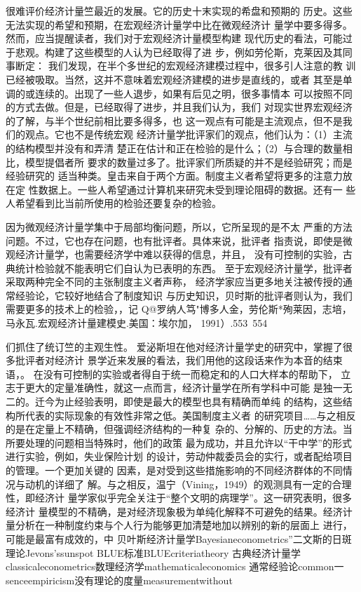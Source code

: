 很难评价经济计量竺最近的发展。它的历史十末实现的希盘和预期的
历史。这些无法实现的希望和预期，在宏观经济计量学中比在微观经济计
量学中要多得多。然而，应当提醒读者，我们对于宏观经济计量模型构建
现代历史的看法，可能过于悲观。构建了这些模型的人认为已经取得了进
步，例如劳伦斯，克莱因及其同事断定：
我们发现，在半个多世纪的宏观经济建模过程中，很多引人注意的教
训已经被吸取。当然，这并不意味着宏观经济建模的进步是直线的，或者
其至是单调的或连续的。出现了一些人退步，如果有后见之明，很多事情本
可以按照不同的方式去做。但是，已经取得了进步，并且我们认为，我们
对现实世界宏观经济的了解，与半个世纪前相比要多得多，也
这一观点有可能是主流观点，但不是我们的观点。它也不是传统宏观
经济计量学批评家们的观点，他们认为：（1）主流的结构模型并没有和弄清
楚正在估计和正在检验的是什么；（2）与合理的数量相比，模型提倡者所
要求的数量过多了。批评家们所质疑的并不是经验研究；而是经验研究的
适当种类。皇击来自于两个方面。制度主义者希望将更多的注意力放在定
性数据上。一些人希望通过计算机来研究未受到理论阻碍的数据。还有一
些人希望看到比当前所使用的检验还要复杂的检验。

因为微观经济计量学集中于局部均衡问题，所以，它所呈现的是不太
严重的方法问题。不过，它也存在问题，也有批评者。具体来说，批评者
指责说，即使是微观经济计量学，也需要经济学中难以获得的信息，并且，
没有可控制的实验，古典统计检验就不能表明它们自认为已表明的东西。
至于宏观经济计量学，批评者采取两种完全不同的主张制度主义者声称，
经济学家应当更多地关注被传授的通常经验论，它较好地结合了制度知识
与历史知识，贝时斯的批评者则认为，我们需要更多的技术上的检验，，记
Q@罗纳人笃"博多人金，劳伦斯*殉莱因，志培，马永瓦.宏观经济计量建模史.美国：埃尔加，
1991）.553~554


们抓住了统订竺的主观生性。
爱泌斯坦在他对经济计量学史的研究中，掌握了很多批评者对经济计
景学近来发展的看法，我们用他的这段话来作为本音的结束语，。
在没有可控制的实验或者得自于统一而稳定和的人口大样本的帮助下，
立志于更大的定量准确性，就这一点而言，经济计量学在所有学科中可能
是独一无二的。迁今为止经验表明，即使是最大的模型也具有精确而单纯
的结构，这些结构所代表的实际现象的有效性非常之低。美国制度主义者
的研究项目……与之相反的是在定量上不精确，但强调经济结构的一种复
杂的、分解的、历史的方法。当所要处理的问题相当特殊时，他们的政策
最为成功，并且允许以“干中学”的形式进行实验，例如，失业保险计划
的设计，劳动仲裁委员会的实行，或者配给项目的管理。一个更加关键的
因素，是对受到这些措施影响的不同经济群体的不同情况与动机的详细了
解。与之相反，温宁（Vining，1949）的观测具有一定的合理性，即经济计
量学家似乎完全关注于“整个文明的病理学”。这一研究表明，很多经济计
量模型的不精确，是对经济现象极为单纯化解释不可避免的结果。经济计
量分析在一种制度约束与个人行为能够更加清楚地加以辨别的新的层面上
进行，可能是最富有成效的，中
贝叶斯经济计量学Bayesianeconometrics”二文斯的日斑理论Jevons’ssunspot
BLUE标准BLUEcriteriatheory
古典经济计量学classicaleconometrics数理经济学mathematicaleconomics
通常经验论common一senceempiricism没有理论的度量measurementwithout

